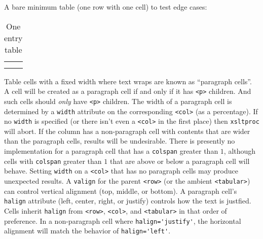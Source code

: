 \documentclass[10pt,]{article}
\theoremstyle{plain}
\theoremstyle{definition}
\theoremstyle{definition}
\theoremstyle{definition}
\theoremstyle{definition}
\theoremstyle{definition}
\theoremstyle{definition}
\numberwithin{equation}{section}
\newcommand{\hrulemedium}{\noalign{\hrule height 0.07em}}
\begin{document}
\hypertarget{p-449}{}%
A bare minimum table (one row with one cell) to test edge cases:%
\begin{table}
\centering
\begin{tabular}{l}\hrulemedium
\multicolumn{1}{AlA}{One}\tabularnewline\hrulemedium
\end{tabular}
\caption{One entry table\label{table-minimal}}
\end{table}
\hypertarget{p-450}{}%
Table cells with a fixed width where text wraps are known as ``paragraph cells''. A cell will be created as a paragraph cell if and only if it has \lstinline?<p>? children. And such cells should \emph{only} have \lstinline?<p>? children. The width of a paragraph cell is determined by a \lstinline?width? attribute on the corresponding \lstinline?<col>? (as a percentage). If no \lstinline?width? is specified (or there isn't even a \lstinline?<col>? in the first place) then \lstinline?xsltproc? will abort. If the column has a non-paragraph cell with contents that are wider than the paragraph cells, results will be undesirable. There is presently no implementation for a paragraph cell that has a \lstinline?colspan? greater than \(1\), although cells with \lstinline?colspan? greater than \(1\) that are above or below a paragraph cell will behave. Setting \lstinline?width? on a \lstinline?<col>? that has no paragraph cells may produce unexpected results. A \lstinline?valign? for the parent \lstinline?<row>? (or the ambient \lstinline?<tabular>?) can control vertical alignment (top, middle, or bottom). A paragraph cell's \lstinline?halign? attribute (left, center, right, or justify) controls how the text is justfied. Cells inherit \lstinline?halign? from \lstinline?<row>?, \lstinline?<col>?, and \lstinline?<tabular>? in that order of preference. In a non-paragraph cell where \lstinline?halign='justify'?, the horizontal alignment will match the behavior of \lstinline?halign='left'?.%
\end{document}
